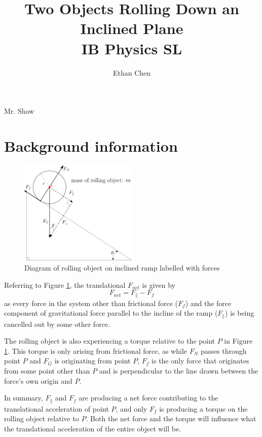\documentclass[letterpaper, 12pt]{article}
\title{Two Objects Rolling Down an Inclined Plane \\ IB Physics SL}
\author{Ethan Chen}
\begin{document}
\maketitle

\begin{center}
    Mr. Shaw
\end{center}

\tableofcontents

\section{Background information}

\begin{figure}[H]
    \centering
    \includegraphics[width=0.5\textwidth]{ramp_incline_labelled}
    \caption{Diagram of rolling object on inclined ramp labelled with forces}
    \label{fig:ramp_labelled}
\end{figure}

Referring to Figure \ref*{fig:ramp_labelled}, the translational $F_{net}$ is given by
$$
    F_{net} = F_{\parallel} - F_f
$$
as every force in the system other than frictional force ($F_f$) and the force component of
gravitational force parallel to the incline of the ramp ($F_{\parallel}$) is being cancelled
out by some other force.

The rolling object is also experiencing a torque relative to the point $P$ in Figure \ref*{fig:ramp_labelled}.
This torque is only arising from frictional force, as while $F_N$ passes through
point $P$ and $F_G$ is originating from point $P$, $F_f$ is the only force that originates from some point other than $P$ and is perpendicular
to the line drawn between the force's own origin and $P$.

In summary, $F_{\parallel}$ and $F_f$ are producing a net force contributing to the
translational acceleration of point $P$, and only $F_f$ is producing a torque on
the rolling object relative to $P$. Both the net force and the torque will influence
what the translational acceleration of the entire object will be.
\end{document}
